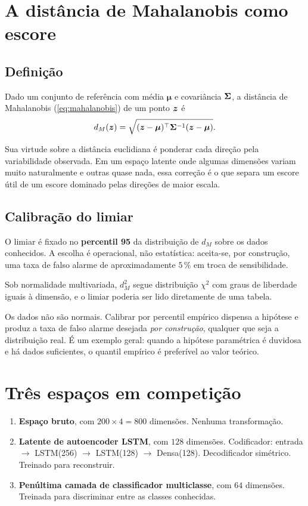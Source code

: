 \section{A distância de Mahalanobis como escore}

\subsection{Definição}

Dado um conjunto de referência com média $\bm{\mu}$ e covariância $\bm{\Sigma}$, a
distância de Mahalanobis (\cref{eq:mahalanobis}) de um ponto $\bm{z}$ é
\[
  d_M(\bm{z}) = \sqrt{(\bm{z} - \bm{\mu})^\top \bm{\Sigma}^{-1} (\bm{z} - \bm{\mu})}.
\]

Sua virtude sobre a distância euclidiana é ponderar cada direção pela variabilidade
observada. Em um espaço latente onde algumas dimensões variam muito naturalmente e
outras quase nada, essa correção é o que separa um escore útil de um escore dominado
pelas direções de maior escala.

\subsection{Calibração do limiar}

O limiar é fixado no \textbf{percentil 95} da distribuição de $d_M$ sobre os dados
conhecidos. A escolha é operacional, não estatística: aceita-se, por construção, uma
taxa de falso alarme de aproximadamente $5\,\%$ em troca de sensibilidade.

\begin{destaque}
Sob normalidade multivariada, $d_M^2$ segue distribuição $\chi^2$ com graus de liberdade
iguais à dimensão, e o limiar poderia ser lido diretamente de uma tabela.

Os dados não são normais. Calibrar por percentil empírico dispensa a hipótese e produz a
taxa de falso alarme desejada \emph{por construção}, qualquer que seja a distribuição
real. É um exemplo geral: quando a hipótese paramétrica é duvidosa e há dados
suficientes, o quantil empírico é preferível ao valor teórico.
\end{destaque}

\section{Três espaços em competição}

\begin{enumerate}[leftmargin=*,itemsep=0.4em]
  \item \textbf{Espaço bruto}, com $200 \times 4 = 800$ dimensões. Nenhuma transformação.
  \item \textbf{Latente de autoencoder LSTM}, com $128$ dimensões. Codificador:
        entrada $\to$ LSTM(256) $\to$ LSTM(128) $\to$ Densa(128). Decodificador
        simétrico. Treinado para reconstruir.
  \item \textbf{Penúltima camada de classificador multiclasse}, com $64$ dimensões.
        Treinada para discriminar entre as classes conhecidas.
\end{enumerate}


